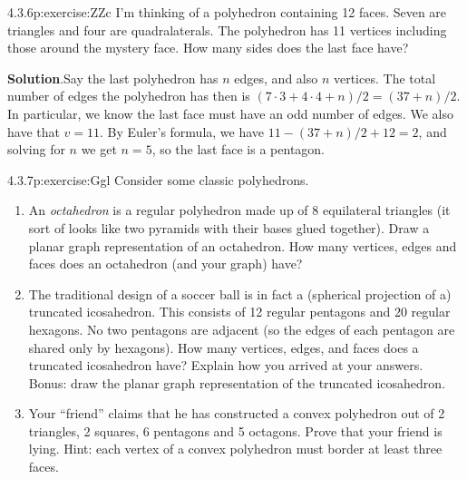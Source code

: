 \documentclass[twoside,11pt,]{book}
\newcommand{\blocktitlefont}{\relax}
\numberwithin{equation}{chapter}
\begin{document}
\begin{divisionsolution}{4.3.6}{}{p:exercise:ZZc}%
I'm thinking of a polyhedron containing 12 faces. Seven are triangles and four are quadralaterals. The polyhedron has 11 vertices including those around the mystery face. How many sides does the last face have?%
\par\smallskip%
\noindent\textbf{\blocktitlefont Solution}.\quad{}Say the last polyhedron has \(n\) edges, and also \(n\) vertices. The total number of edges the polyhedron has then is \((7 \cdot 3 + 4 \cdot 4 + n)/2 = (37 + n)/2\). In particular, we know the last face must have an odd number of edges. We also have that \(v = 11 \). By Euler's formula, we have \(11 - (37+n)/2 + 12 = 2\), and solving for \(n\) we get \(n = 5\), so the last face is a pentagon.%
\end{divisionsolution}%
\begin{divisionsolution}{4.3.7}{}{p:exercise:Ggl}%
Consider some classic polyhedrons.%
\begin{enumerate}[label=(\alph*)]
\item{}An \emph{octahedron} is a regular polyhedron made up of 8 equilateral triangles (it sort of looks like two pyramids with their bases glued together). Draw a planar graph representation of an octahedron. How many vertices, edges and faces does an octahedron (and your graph) have? %
\item{}The traditional design of a soccer ball is in fact a (spherical projection of a) truncated icosahedron. This consists of 12 regular pentagons and 20 regular hexagons. No two pentagons are adjacent (so the edges of each pentagon are shared only by hexagons). How many vertices, edges, and faces does a truncated icosahedron have? Explain how you arrived at your answers. Bonus: draw the planar graph representation of the truncated icosahedron. %
\item{}Your ``friend'' claims that he has constructed a convex polyhedron out of 2 triangles, 2 squares, 6 pentagons and 5 octagons. Prove that your friend is lying. Hint: each vertex of a convex polyhedron must border at least three faces. %
\end{enumerate}
%
\end{divisionsolution}%
\end{document}
